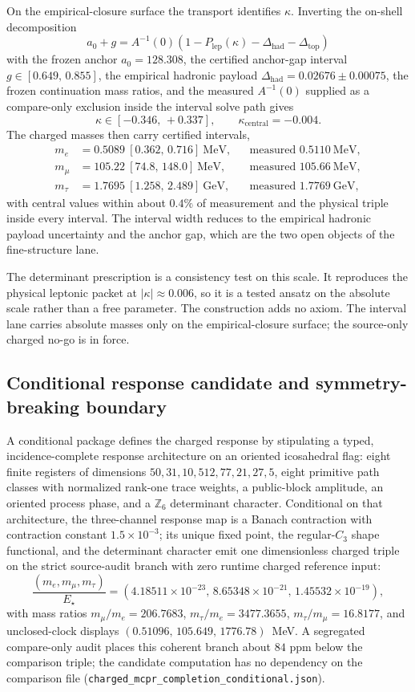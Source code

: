 \documentclass[11pt]{article}
\begin{document}
On the empirical-closure surface the transport identifies \(\kappa\). Inverting the on-shell
decomposition
\[
a_0+g=A^{-1}(0)\left(1-P_{\mathrm{lep}}(\kappa)-\Delta_{\mathrm{had}}-\Delta_{\mathrm{top}}\right)
\]
with the frozen anchor \(a_0=128.308\), the certified anchor-gap interval \(g\in[0.649,\,0.855]\),
the empirical hadronic payload \(\Delta_{\mathrm{had}}=0.02676\pm0.00075\), the frozen
continuation mass ratios,
and the measured \(A^{-1}(0)\) supplied as a compare-only exclusion inside the interval solve path
gives
\[
\kappa\in[-0.346,\,+0.337],\qquad \kappa_{\mathrm{central}}=-0.004.
\]
The charged masses then carry certified intervals,
\[
\begin{aligned}
m_e&=0.5089~[0.362,\,0.716]~\mathrm{MeV}, & &\text{measured } 0.5110~\mathrm{MeV},\\
m_\mu&=105.22~[74.8,\,148.0]~\mathrm{MeV}, & &\text{measured } 105.66~\mathrm{MeV},\\
m_\tau&=1.7695~[1.258,\,2.489]~\mathrm{GeV}, & &\text{measured } 1.7769~\mathrm{GeV},
\end{aligned}
\]
with central values within about \(0.4\%\) of measurement and the physical triple inside every
interval. The interval width reduces to the empirical hadronic payload uncertainty and the anchor
gap, which are the two open objects of the fine-structure lane.

The determinant prescription is a consistency test on this scale. It reproduces
the physical leptonic packet at \(|\kappa|\approx0.006\), so it is a tested
ansatz on the absolute scale rather than a free parameter. The
construction adds no axiom. The interval lane carries absolute masses only on the
empirical-closure surface; the source-only charged no-go is in force.

\subsection{Conditional response candidate and symmetry-breaking boundary}\label{charged-mcpr-frontier}

A conditional package defines the charged response by
stipulating a typed, incidence-complete response architecture on an oriented
icosahedral flag: eight finite registers of dimensions
\(50,31,10,512,77,21,27,5\), eight primitive path classes with normalized
rank-one trace weights, a public-block amplitude, an oriented process phase,
and a \(\mathbb Z_6\) determinant character.  Conditional on that
architecture, the three-channel response map is a Banach contraction with
contraction constant \(1.5\times10^{-3}\); its unique fixed point, the
regular-\(C_3\) shape functional, and the determinant character emit one
dimensionless charged triple on the strict source-audit branch with zero
runtime charged reference input:
\[
\frac{(m_e,m_\mu,m_\tau)}{E_\star}
=(4.18511\times10^{-23},\,8.65348\times10^{-21},\,1.45532\times10^{-19}),
\]
with mass ratios \(m_\mu/m_e=206.7683\), \(m_\tau/m_e=3477.3655\),
\(m_\tau/m_\mu=16.8177\), and unclosed-clock displays
\((0.51096,\,105.649,\,1776.78)\)~MeV.  A segregated compare-only audit
places this coherent branch about \(84\) ppm below the comparison
triple; the candidate computation has no dependency on the comparison file
(\texttt{charged\_mcpr\_completion\_conditional.json}).
\end{document}
